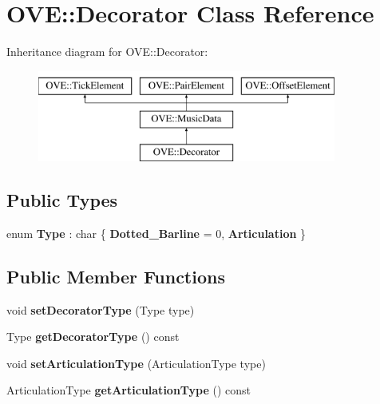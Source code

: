 \hypertarget{class_o_v_e_1_1_decorator}{}\section{O\+VE\+:\+:Decorator Class Reference}
\label{class_o_v_e_1_1_decorator}
Inheritance diagram for O\+VE\+:\+:Decorator\+:\begin{figure}[H]
\begin{center}
\leavevmode
\includegraphics[height=3.000000cm]{class_o_v_e_1_1_decorator}
\end{center}
\end{figure}
\subsection*{Public Types}
\begin{DoxyCompactItemize}
\item 
\mbox{\label{class_o_v_e_1_1_decorator_a8d301142d7910ee294cbb353d51636bf}} 
enum {\bfseries Type} \+: char \{ {\bfseries Dotted\+\_\+\+Barline} = 0, 
{\bfseries Articulation}
 \}
\end{DoxyCompactItemize}
\subsection*{Public Member Functions}
\begin{DoxyCompactItemize}
\item 
\mbox{\label{class_o_v_e_1_1_decorator_aca01a4340247b38c5e6e2cfb993c7aeb}} 
void {\bfseries set\+Decorator\+Type} (Type type)
\item 
\mbox{\label{class_o_v_e_1_1_decorator_aae10f729ef898a404a51ebf3c1393e87}} 
Type {\bfseries get\+Decorator\+Type} () const
\item 
\mbox{\label{class_o_v_e_1_1_decorator_aa2f59685b6384a775baab5f5ff9b0d99}} 
void {\bfseries set\+Articulation\+Type} (Articulation\+Type type)
\item 
\mbox{\label{class_o_v_e_1_1_decorator_a710bf0bb90f411c8f7751a2676095c60}} 
Articulation\+Type {\bfseries get\+Articulation\+Type} () const
\end{DoxyCompactItemize}
